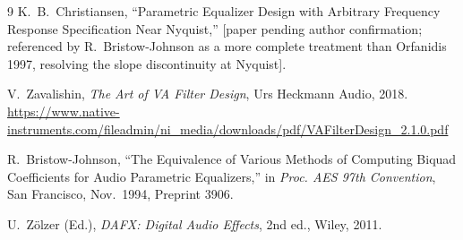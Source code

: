 \documentclass[11pt,a4paper]{article}
\begin{document}
\begin{thebibliography}{9}
K.~B.~Christiansen, ``Parametric Equalizer Design with Arbitrary Frequency
Response Specification Near Nyquist,'' [paper pending author confirmation;
referenced by R.~Bristow-Johnson as a more complete treatment than Orfanidis
1997, resolving the slope discontinuity at Nyquist].

V.~Zavalishin, \textit{The Art of VA Filter Design}, Urs Heckmann Audio, 2018.
\url{https://www.native-instruments.com/fileadmin/ni_media/downloads/pdf/VAFilterDesign_2.1.0.pdf}

R.~Bristow-Johnson, ``The Equivalence of Various Methods of Computing Biquad
Coefficients for Audio Parametric Equalizers,''
in \textit{Proc. AES 97th Convention}, San Francisco, Nov.\ 1994, Preprint 3906.

U.~Z{\"o}lzer (Ed.), \textit{DAFX: Digital Audio Effects}, 2nd ed.,
Wiley, 2011.
\end{thebibliography}
\end{document}

